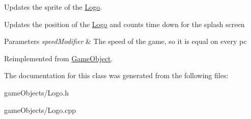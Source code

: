 Updates the sprite of the \hyperlink{class_logo}{Logo}. 

Updates the position of the \hyperlink{class_logo}{Logo} and counts time down for the splash screen 
\begin{DoxyParams}{Parameters}
{\em speed\+Modifier} & The speed of the game, so it is equal on every pc \\
\hline
\end{DoxyParams}


Reimplemented from \hyperlink{class_game_object_acf6423054877d1344b6e0b1f4e740df5}{Game\+Object}.



The documentation for this class was generated from the following files\+:\begin{DoxyCompactItemize}
\item 
game\+Objects/Logo.\+h\item 
game\+Objects/Logo.\+cpp\end{DoxyCompactItemize}
